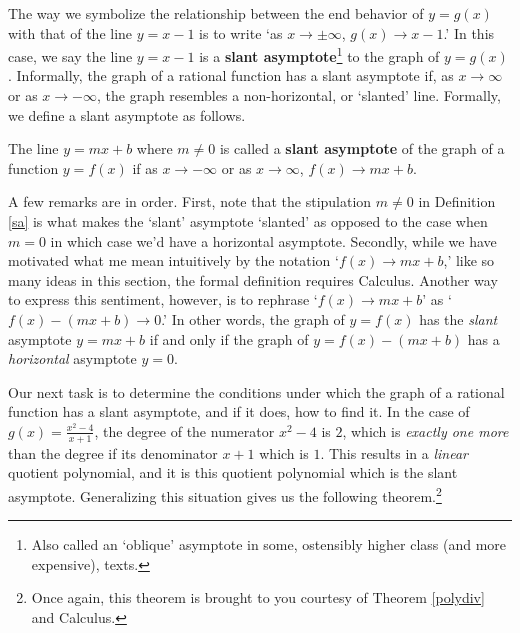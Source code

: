 The way we symbolize the relationship between the end behavior of $y=g(x)$ with that of the line $y=x-1$ is to write `as $x \rightarrow \pm \infty$, $g(x) \rightarrow x-1$.'  In this case, we say the line $y=x-1$ is a    \textbf{slant asymptote}\footnote{Also called an `oblique' asymptote in some, ostensibly higher class (and more expensive), texts.}  to the graph of $y=g(x)$.  Informally, the graph of a rational function has a slant asymptote if, as $x \rightarrow \infty$ or as $x \rightarrow -\infty$, the graph resembles a non-horizontal, or `slanted' line.  Formally, we define a slant asymptote as follows.


\medskip


\colorbox{ResultColor}{\bbm

\begin{defn} \label{sa} The line $y = mx+b$ where $m \neq 0$  is called a \textbf{slant asymptote} of the graph of a function $y=f(x)$ if as $x \rightarrow -\infty$ or as $x \rightarrow \infty$, $f(x)  \rightarrow mx+b$.


\end{defn}
\ebm}

\medskip


A few remarks are in order.  First, note that the stipulation $m \neq 0$ in Definition \ref{sa} is what makes the `slant' asymptote `slanted' as opposed to the case when $m=0$ in which case we'd have a horizontal asymptote.  Secondly, while we have motivated what me mean intuitively by the notation `$f(x)  \rightarrow mx+b$,' like so many ideas in this section, the formal definition requires Calculus.  Another way to express this sentiment, however, is to rephrase `$f(x)  \rightarrow mx+b$' as `$f(x) - (mx+b) \rightarrow 0$.'  In other words, the graph of $y=f(x)$ has the \textit{slant} asymptote $y = mx+b$ if and only if the graph of $y = f(x) - (mx+b)$ has a \textit{horizontal} asymptote $y=0$.


Our next task is to determine the conditions under which the graph of a rational function has a slant asymptote, and if it does, how to find it.  In the case of $g(x) = \frac{x^2-4}{x+1}$, the degree of the numerator $x^2-4$ is $2$, which is \textit{exactly one more} than the degree if its denominator $x+1$ which is $1$.  This results in a \textit{linear} quotient polynomial, and it is this quotient polynomial which is the slant asymptote.  Generalizing this situation gives us the following theorem.\footnote{Once again, this theorem is brought to you courtesy of Theorem \ref{polydiv} and Calculus.}

